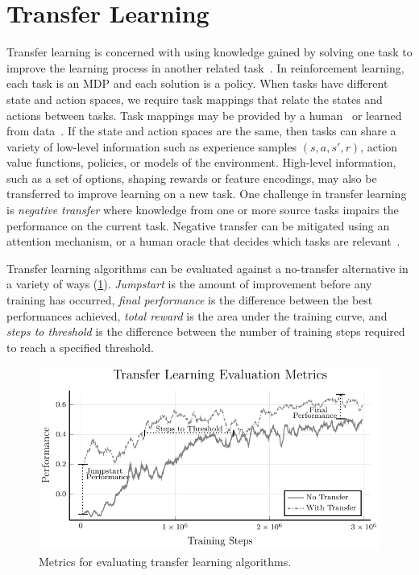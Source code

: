 \section{Transfer Learning}
Transfer learning is concerned with using knowledge gained by solving one task to improve the learning process in another related task~\cite{taylor2009transfer}. In reinforcement learning, each task is an MDP and each solution is a policy. When tasks have different state and action spaces, we require task mappings that relate the states and actions between tasks. Task mappings may be provided by a human~\cite{taylor2007transfer} or learned from data~\cite{taylor2008autonomous}. If the state and action spaces are the same, then tasks can share a variety of low-level information such as experience samples $(s, a, s', r)$, action value functions, policies, or models of the environment. High-level information, such as a set of options, shaping rewards or feature encodings, may also be transferred to improve learning on a new task. One challenge in transfer learning is \emph{negative transfer} where knowledge from one or more source tasks impairs the performance on the current task. Negative transfer can be mitigated using an attention mechanism, or a human oracle that decides which tasks are relevant~\cite{taylor2009transfer}. 

Transfer learning algorithms can be evaluated against a no-transfer alternative in a variety of ways (\cref{fig:transfer_metrics}). \emph{Jumpstart} is the amount of improvement before any training has occurred, \emph{final performance} is the difference between the best performances achieved, \emph{total reward} is the area under the training curve,  and \emph{steps to threshold} is the difference between the number of training steps required to reach a specified threshold.

\begin{figure}
\centering
\includegraphics[width=0.8\linewidth]{figures/iterative_validation/transfer_metrics}
\caption{Metrics for evaluating transfer learning algorithms. }
\label{fig:transfer_metrics}
\end{figure}

